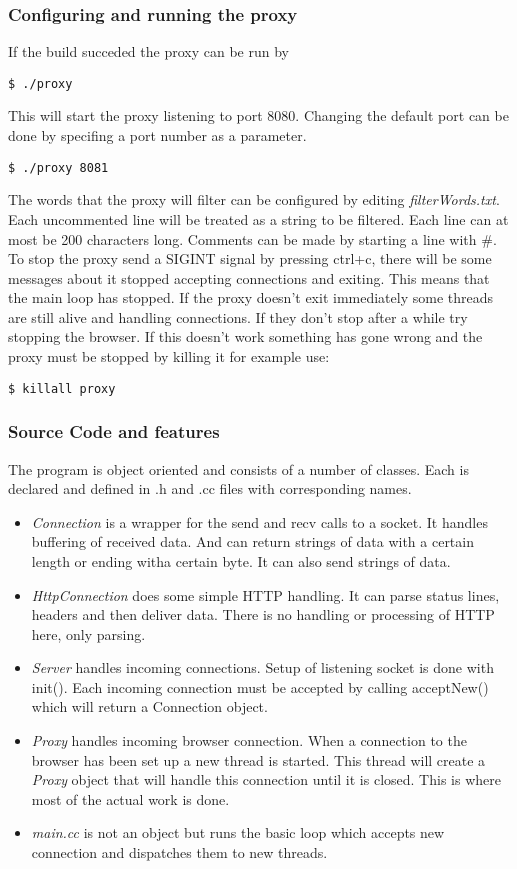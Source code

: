 \documentclass[a4paper,11pt]{article}
\begin{document}
\subsubsection{Configuring and running the proxy}
If the build succeded the proxy can be run by
\begin{verbatim}$ ./proxy\end{verbatim}
This will start the proxy listening to port 8080.
Changing the default port can be done by specifing a port number as a parameter.
\begin{verbatim}$ ./proxy 8081\end{verbatim}
The words that the proxy will filter can be configured by editing \emph{filterWords.txt}.
Each uncommented line will be treated as a string to be filtered. Each line can at most be 200 characters long.
Comments can be made by starting a line with \#.
To stop the proxy send a SIGINT signal by pressing ctrl+c, there will be some messages about it stopped accepting connections and exiting.
This means that the main loop has stopped.
If the proxy doesn't exit immediately some threads are still alive and handling connections.
If they don't stop after a while try stopping the browser.
If this doesn't work something has gone wrong and the proxy must be stopped by killing it for example use:
\begin{verbatim}$ killall proxy\end{verbatim}

\subsubsection{Source Code and features}
The program is object oriented and consists of a number of classes. Each is declared and defined in .h and .cc files with corresponding names.
\begin{itemize}
  \item \emph{Connection} is a wrapper for the send and recv calls to a socket.
    It handles buffering of received data. 
    And can return strings of data with a certain length or ending witha  certain byte.
    It can also send strings of data.
  \item \emph{HttpConnection} does some simple HTTP handling. 
    It can parse status lines, headers and then deliver data.
    There is no handling or processing of HTTP here, only parsing.
  \item \emph{Server} handles incoming connections. 
    Setup of listening socket is done with init().
    Each incoming connection must be accepted by calling acceptNew() which will return a Connection object.
  \item \emph{Proxy} handles incoming browser connection.
    When a connection to the browser has been set up a new thread is started. 
    This thread will create a \emph{Proxy} object that will handle this connection until it is closed.
    This is where most of the actual work is done. 
  \item \emph{main.cc} is not an object but runs the basic loop which accepts new connection and dispatches them to new threads.
\end{itemize}
\end{document}
